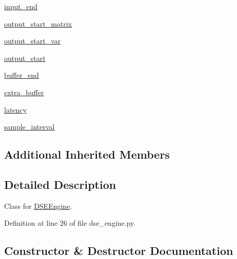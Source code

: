 \begin{DoxyCompactItemize}
\hyperlink{classsylva_1_1dse_1_1dse__engine_1_1_d_s_e_engine_a0242234399635fcf37404f0e5f076fe9}{input\+\_\+end}
\item 
\hyperlink{classsylva_1_1dse_1_1dse__engine_1_1_d_s_e_engine_a58f127ba6fa1f6508ba7a0c410426523}{output\+\_\+start\+\_\+matrix}
\item 
\hyperlink{classsylva_1_1dse_1_1dse__engine_1_1_d_s_e_engine_a7159f7f1106066defdacd1e7f6946c09}{output\+\_\+start\+\_\+var}
\item 
\hyperlink{classsylva_1_1dse_1_1dse__engine_1_1_d_s_e_engine_a44464cd48ab9fdc7a563abddc6b81e22}{output\+\_\+start}
\item 
\hyperlink{classsylva_1_1dse_1_1dse__engine_1_1_d_s_e_engine_a28f67d8649d0dd00ad2ac7322c103dd8}{buffer\+\_\+end}
\item 
\hyperlink{classsylva_1_1dse_1_1dse__engine_1_1_d_s_e_engine_af46f494d25fd2d645fa3fe2aacb8089d}{extra\+\_\+buffer}
\item 
\hyperlink{classsylva_1_1dse_1_1dse__engine_1_1_d_s_e_engine_ade7705ca9c2537615ab4c07171565b56}{latency}
\item 
\hyperlink{classsylva_1_1dse_1_1dse__engine_1_1_d_s_e_engine_a1afdcfe12de1556102777e9485c12fc5}{sample\+\_\+interval}
\end{DoxyCompactItemize}
\subsection*{Additional Inherited Members}


\subsection{Detailed Description}
Class for \hyperlink{classsylva_1_1dse_1_1dse__engine_1_1_d_s_e_engine}{D\+S\+E\+Engine}. 

Definition at line 26 of file dse\+\_\+engine.\+py.



\subsection{Constructor \& Destructor Documentation}
\mbox{\label{classsylva_1_1dse_1_1dse__engine_1_1_d_s_e_engine_ab4e96933ec1d0cf9225f8955bb8460f8}} 
